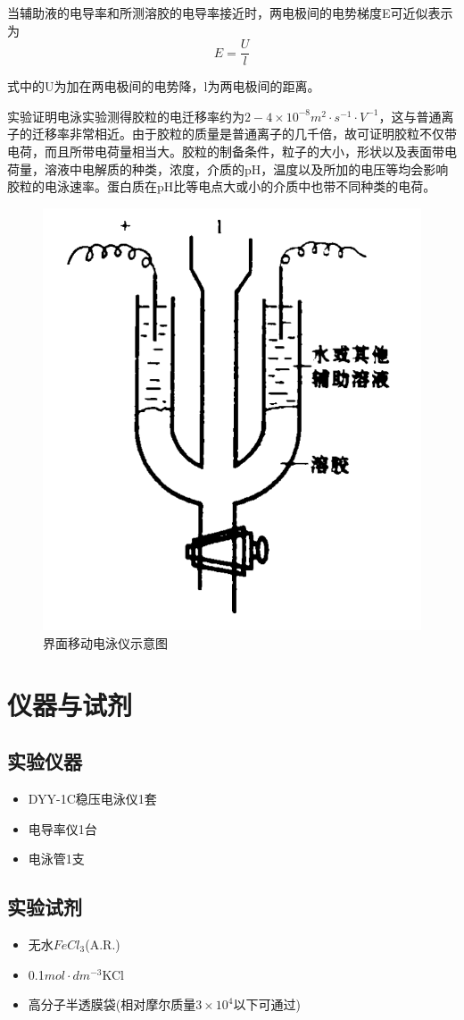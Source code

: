 \documentclass[12pt,hyperref,a4paper,UTF8]{ctexart}
\begin{document}
当辅助液的电导率和所测溶胶的电导率接近时，两电极间的电势梯度E可近似表示为
\begin{equation}
    E = \frac{U}{l}
\end{equation}

式中的U为加在两电极间的电势降，l为两电极间的距离。

实验证明电泳实验测得胶粒的电迁移率约为$2-4\times 10^{-8} m^2\cdot s^{-1} \cdot V^{-1}$，这与普通离子的迁移率非常相近。由于胶粒的质量是普通离子的几千倍，故可证明胶粒不仅带电荷，而且所带电荷量相当大。胶粒的制备条件，粒子的大小，形状以及表面带电荷量，溶液中电解质的种类，浓度，介质的pH，温度以及所加的电压等均会影响胶粒的电泳速率。蛋白质在pH比等电点大或小的介质中也带不同种类的电荷。

\begin{figure}[htp]
    \centering
    \includegraphics[width=0.3\linewidth]{截屏2023-12-11 23.03.00.png}
    \caption{界面移动电泳仪示意图}
    \label{fig:enter-label1}
\end{figure}



\section{仪器与试剂}
\subsection{实验仪器}
\begin{itemize}
    \item DYY-1C稳压电泳仪1套
    \item 电导率仪1台
    \item 电泳管1支
\end{itemize}


\subsection{实验试剂}
\begin{itemize}
    \item 无水$FeCl_3$(A.R.)
    \item 0.1$mol\cdot dm^{-3}$KCl
    \item 高分子半透膜袋(相对摩尔质量$3\times 10^4$以下可通过)
\end{itemize}
\end{document}
